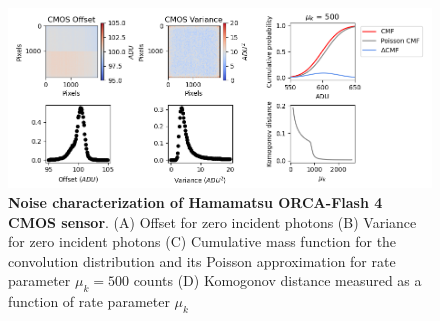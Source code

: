 \documentclass{ucetd}
\begin{document}
\begin{figure}
\begin{center}
\includegraphics[width=16cm]{Noise.png}
\end{center}
\caption{\textbf{Noise characterization of Hamamatsu ORCA-Flash 4 CMOS sensor}. (A) Offset for zero incident photons (B) Variance for zero incident photons (C) Cumulative mass function for the convolution distribution and its Poisson approximation for rate parameter $\mu_{k} = 500$ counts (D) Komogonov distance measured as a function of rate parameter $\mu_{k}$}
\end{figure}



\end{document}

